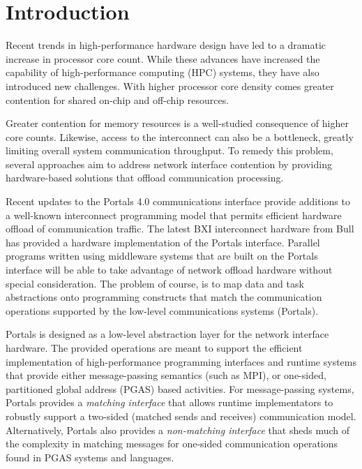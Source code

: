 \section{Introduction}


Recent trends in high-performance hardware design have led to a dramatic increase in
processor core count. While these advances have increased the capability of
high-performance computing (HPC) systems, they have also introduced new
challenges. With higher processor core density comes greater
contention for shared on-chip and off-chip resources. 

Greater contention for memory resources is a well-studied
consequence of higher core counts. Likewise, access to the
interconnect can also be a bottleneck, greatly limiting overall system
communication throughput. To remedy this problem, several approaches
aim to address network interface contention by providing
hardware-based solutions that offload communication
processing. 

Recent updates to the Portals 4.0 communications interface provide
additions to a well-known interconnect programming model that permits
efficient hardware offload of communication traffic. The latest BXI
interconnect hardware from Bull has provided a hardware implementation
of the Portals interface.  Parallel programs written using middleware
systems that are built on the Portals interface will be able to take
advantage of network offload hardware without special consideration. 
The problem of course, is to map data and task abstractions onto
programming constructs that match the communication operations
supported by the low-level communications systems (Portals). 

Portals is designed as a low-level abstraction layer for the network
interface hardware. The provided operations are meant to support the
efficient implementation of high-performance programming interfaces
and runtime systems that provide either message-passing semantics
(such as MPI), or one-sided, partitioned global address (PGAS) based
activities. For message-passing systems, Portals provides a {\em
  matching interface} that allows runtime implementators to robustly
support a two-sided (matched sends and receives) communication
model. Alternatively, Portals also provides a {\em non-matching
  interface} that sheds much of the complexity in matching messages
for one-sided communication operations found in PGAS systems and
languages.

